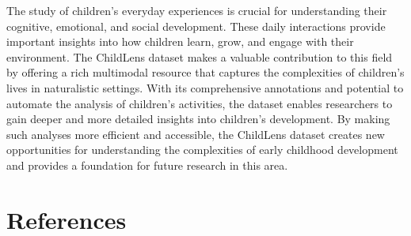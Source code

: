 \documentclass[
  man,floatsintext]{apa6}
\begin{document}
The study of children's everyday experiences is crucial for understanding their cognitive, emotional, and social development. These daily interactions provide important insights into how children learn, grow, and engage with their environment. The ChildLens dataset makes a valuable contribution to this field by offering a rich multimodal resource that captures the complexities of children's lives in naturalistic settings. With its comprehensive annotations and potential to automate the analysis of children's activities, the dataset enables researchers to gain deeper and more detailed insights into children's development. By making such analyses more efficient and accessible, the ChildLens dataset creates new opportunities for understanding the complexities of early childhood development and provides a foundation for future research in this area.

\newpage

\section{References}\label{references}

\begingroup
\setlength{\parindent}{-0.5in}
\setlength{\leftskip}{0.5in}
\end{document}
